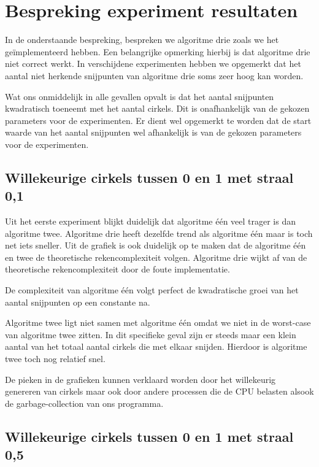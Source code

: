 \documentclass[11pt,a4paper]{article}
\begin{document}
\section{Bespreking experiment resultaten}

In de onderstaande bespreking, bespreken we algoritme drie zoals we het ge\"implementeerd hebben. Een belangrijke opmerking hierbij is dat algoritme drie niet correct werkt. In verschijdene experimenten hebben we opgemerkt dat het aantal niet herkende snijpunten van algoritme drie soms zeer hoog kan worden.

Wat ons onmiddelijk in alle gevallen opvalt is dat het aantal snijpunten kwadratisch toeneemt met het aantal cirkels. Dit is onafhankelijk van de gekozen parameters voor de experimenten. Er dient wel opgemerkt te worden dat de start waarde van het aantal snijpunten wel afhankelijk is van de gekozen parameters voor de experimenten.

\subsection{Willekeurige cirkels tussen 0 en 1 met straal 0,1}

Uit het eerste experiment blijkt duidelijk dat algoritme \'e\'en veel trager is dan algoritme twee. Algoritme drie heeft dezelfde trend als algoritme \'e\'en maar is toch net iets sneller. Uit de grafiek is ook duidelijk op te maken dat de algoritme \'e\'en en twee de theoretische rekencomplexiteit volgen. Algoritme drie wijkt af van de theoretische rekencomplexiteit door de foute implementatie.

De complexiteit van algoritme \'e\'en volgt perfect de kwadratische groei van het aantal snijpunten op een constante na.

Algoritme twee ligt niet samen met algoritme \'e\'en omdat we niet in de worst-case van algoritme twee zitten. In dit specifieke geval zijn er steeds maar een klein aantal van het totaal aantal cirkels die met elkaar snijden. Hierdoor is algoritme twee toch nog relatief snel.

De pieken in de grafieken kunnen verklaard worden door het willekeurig genereren van cirkels maar ook door andere processen die de CPU belasten alsook de garbage-collection van ons programma. 

\subsection{Willekeurige cirkels tussen 0 en 1 met straal 0,5}
\end{document}
